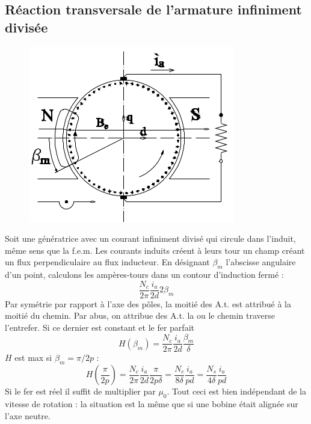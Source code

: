 	\subsection{Réaction transversale de l'armature infiniment divisée}
	\begin{figure}
	\vspace{-5mm}
	\includegraphics[scale=0.34]{ch4/image12.png}
	\end{figure}
	Soit une génératrice avec un courant infiniment divisé qui circule 
	dans l'induit, même sens que la f.e.m. Les courants induits créent 
	à leurs tour un champ créant un flux perpendiculaire au flux 
	inducteur. En désignant $\beta_m$ l'abscisse angulaire d'un point, 
	calculons les ampères-tours dans un contour d'induction fermé :
	\begin{equation}
	\frac{N_c}{2\pi}\frac{i_a}{2d}2\beta_m
	\end{equation}
	Par symétrie par rapport à l'axe des pôles, la moitié des A.t. est 
	attribué à la moitié du chemin. Par abus, on attribue des A.t. la 
	ou le chemin traverse l'entrefer. Si ce dernier est constant et le 
	fer parfait 
	\begin{equation}
	H(\beta_m) = \frac{N_c}{2\pi}\frac{i_a}{2d}\frac{\beta_m}{\delta}
	\end{equation}
	$H$ est max si $\beta_m=\pi/2p$ : 
	\begin{equation}
	H\left(\frac{\pi}{2p}\right) = \frac{N_c}{2\pi}\frac{i_a}{2d}\frac{
	\pi}{2p\delta} = \frac{N_c}{8\delta}\frac{i_a}{pd}=\frac{N_s}{4\delta}
	\frac{i_a}{pd}
	\end{equation}
	Si le fer est réel il suffit de multiplier par $\mu_0$. Tout ceci 
	est bien indépendant de la vitesse de rotation : la situation est 
	la même que si une bobine était alignée sur l'axe neutre.
	
